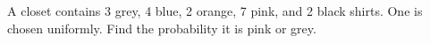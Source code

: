 A closet contains 3 grey, 4 blue, 2 orange, 7 pink, and 2 black shirts. One is chosen uniformly. Find the probability it is pink or grey.
